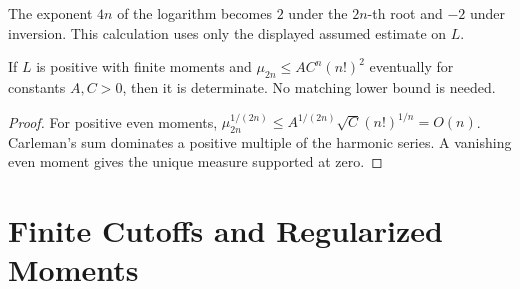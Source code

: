 \begin{remark}
\label{v4-arith:r-comparison:rem:delta-error}
The exponent \(4n\) of the logarithm becomes \(2\) under the
\(2n\)-th root and \(-2\) under inversion. This calculation
uses only the displayed assumed estimate on \(L\).
\end{remark}
\begin{proposition}
\label{v4-arith:r-comparison:rem:heuristic-saves}
If \(L\) is positive with finite moments and
\(\mu_{2n}\leq A C^n(n!)^2\) eventually for constants \(A,C>0\),
then it is determinate. No matching lower bound is needed.
\end{proposition}
\begin{proof}
For positive even moments,
\(\mu_{2n}^{1/(2n)}\leq A^{1/(2n)}\sqrt C(n!)^{1/n}=O(n)\).
Carleman's sum dominates a positive multiple of the harmonic series.
A vanishing even moment gives the unique measure supported at zero.
\end{proof}

\section{Finite Cutoffs and Regularized Moments}
\label{v4-arith:r-comparison:gap-analysis}
